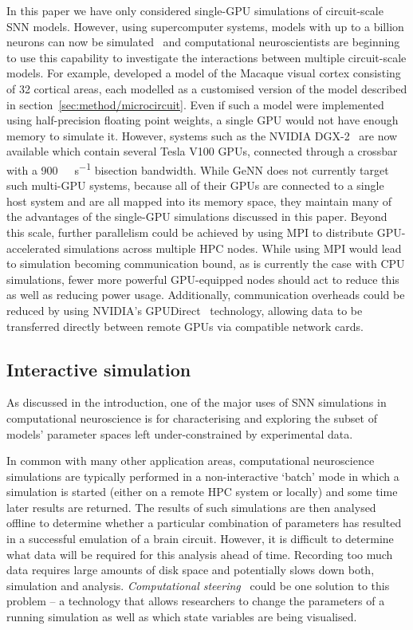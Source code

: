 \documentclass[utf8]{frontiersSCNS} %
\begin{document}
In this paper we have only considered single-GPU simulations of circuit-scale SNN models.
However, using supercomputer systems, models with up to a billion neurons can now be simulated~\citep{Jordan2018} and computational neuroscientists are beginning to use this capability to investigate the interactions between multiple circuit-scale models.
For example, \citet{Schmidt2015} developed a model of the Macaque visual cortex consisting of 32 cortical areas, each modelled as a customised version of the model described in section~\ref{sec:method/microcircuit}.
Even if such a model were implemented using half-precision floating point weights, a single GPU would not have enough memory to simulate it.
However, systems such as the NVIDIA DGX-2~\citep{NVIDIACorporation2018b} are now available which contain several Tesla V100 GPUs, connected through a crossbar with a \SI{900}{\giga\byte\per\second} bisection bandwidth.
While GeNN does not currently target such multi-GPU systems, because all of their GPUs are connected to a single host system and are all mapped into its memory space, they maintain many of the advantages of the single-GPU simulations discussed in this paper.
Beyond this scale, further parallelism could be achieved by using MPI to distribute GPU-accelerated simulations across multiple HPC nodes.
While using MPI would lead to simulation becoming communication bound, as is currently the case with CPU simulations, fewer more powerful GPU-equipped nodes should act to reduce this as well as reducing power usage. 
Additionally, communication overheads could be reduced by using NVIDIA's GPUDirect~\citep{NVIDIACorporation2018c} technology, allowing data to be transferred directly between remote GPUs via compatible network cards.

\subsection{Interactive simulation}
As discussed in the introduction, one of the major uses of SNN simulations in computational neuroscience is for characterising and exploring the subset of models' parameter spaces left under-constrained by experimental data.

In common with many other application areas, computational neuroscience simulations are typically performed in a non-interactive `batch' mode in which a simulation is started (either on a remote HPC system or locally) and some time later results are returned.
The results of such simulations are then analysed offline to determine whether a particular combination of parameters has resulted in a successful emulation of a brain circuit.
However, it is difficult to determine what data will be required for this analysis ahead of time.
Recording too much data requires large amounts of disk space and potentially slows down both, simulation and analysis.
\textit{Computational steering}~\citep{Parker1997} could be one solution to this problem -- a technology that allows researchers to change the parameters of a running simulation as well as which state variables are being visualised.
\end{document}
